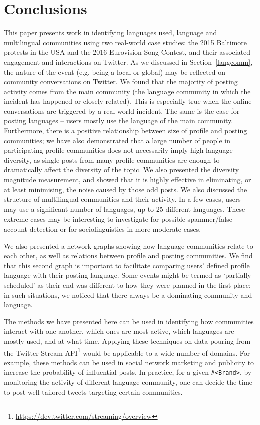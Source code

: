 \documentclass{llncs}
\begin{document}
{\section{Conclusions}\label{conclusions}

This paper presents work in identifying languages used, language and
multilingual communities using two real-world case studies: the 2015
Baltimore protests in the USA and the 2016 Eurovision Song Contest,
and their associated engagement and interactions on Twitter. As we
discussed in Section~\ref{langcomm}, the nature of the event
(e.g. being a local or global) may be reflected on community
conversations on Twitter. We found that the majority of posting
activity comes from the main community (the language community in
which the incident has happened or closely related). This is
especially true when the online conversations are triggered by a
real-world incident. The same is the case for posting languages --
users mostly use the language of the main community. Furthermore,
there is a positive relationship between size of profile and posting
communities; we have also demonstrated that a large number of people
in participating profile communities does not necessarily imply high
language diversity, as single posts from many profile communities are
enough to dramatically affect the diversity of the topic. We also
presented the diversity magnitude measurement, and showed that it is
highly effective in eliminating, or at least minimising, the noise
caused by those odd posts.  We also discussed the structure of
multilingual communities and their activity.  In a few cases, users
may use a significant number of languages, up to 25 different
languages. These extreme cases may be interesting to investigate for
possible spammer/false account detection or for sociolinguistics in
more moderate cases.

We also presented a network graphs showing how language communities
relate to each other, as well as relations between profile and posting
communities. We find that this second graph is important to facilitate
comparing users' defined profile language with their posting
language. Some events might be termed as `partially scheduled' as
their end was different to how they were planned in the first place;
in such situations, we noticed that there always be a dominating
community and language.

The methods we have presented here can be used in identifying how
communities interact with one another, which ones are most active,
which languages are mostly used, and at what time. Applying these
techniques on data pouring from the Twitter Stream
API\footnote{\url{https://dev.twitter.com/streaming/overview}} would
be applicable to a wide number of domains. For example, these methods
can be used in social network marketing and publicity to increase the
probability of influential posts. In practice, for a given
{\texttt{\#<Brand>}}, by monitoring the activity of different language
community, one can decide the time to post well-tailored tweets
targeting certain communities.

}
\end{document}
